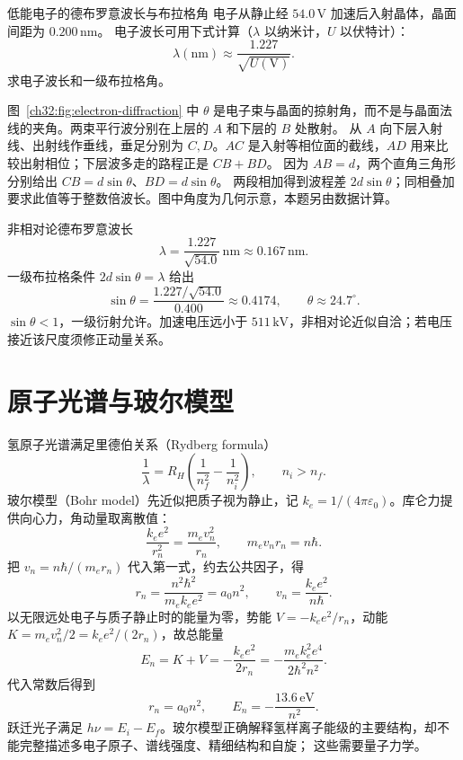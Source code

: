 \begin{origexamplebox}{低能电子的德布罗意波长与布拉格角}
电子从静止经 $54.0\,\mathrm V$ 加速后入射晶体，晶面间距为 $0.200\,\mathrm{nm}$。
电子波长可用下式计算（$\lambda$ 以纳米计，$U$ 以伏特计）：
\[
 \lambda(\mathrm{nm})\approx\frac{1.227}{\sqrt{U(\mathrm V)}}.
\]
求电子波长和一级布拉格角。
\end{origexamplebox}
\begin{xesolution}

\begin{center}

\label{ch32:fig:electron-diffraction}
\end{center}
图~\ref{ch32:fig:electron-diffraction} 中 $\theta$ 是电子束与晶面的掠射角，而不是与晶面法线的夹角。两束平行波分别在上层的 $A$ 和下层的 $B$ 处散射。
从 $A$ 向下层入射线、出射线作垂线，垂足分别为 $C,D$。$AC$ 是入射等相位面的截线，$AD$ 用来比较出射相位；下层波多走的路程正是 $CB+BD$。
因为 $AB=d$，两个直角三角形分别给出 $CB=d\sin\theta$、$BD=d\sin\theta$。
两段相加得到波程差 $2d\sin\theta$；同相叠加要求此值等于整数倍波长。图中角度为几何示意，本题另由数据计算。


非相对论德布罗意波长
\[
 \lambda=\frac{1.227}{\sqrt{54.0}}\,\mathrm{nm}
 \approx\boxed{0.167\,\mathrm{nm}}.
\]
一级布拉格条件 $2d\sin\theta=\lambda$ 给出
\[
 \sin\theta=\frac{1.227/\sqrt{54.0}}{0.400}\approx0.4174,
 \qquad \boxed{\theta\approx24.7^\circ}.
\]
$\sin\theta<1$，一级衍射允许。加速电压远小于 $511\,\mathrm{kV}$，非相对论近似自洽；若电压接近该尺度须修正动量关系。
\end{xesolution}



\section{原子光谱与玻尔模型}

氢原子光谱满足里德伯关系（Rydberg formula）
\begin{equation}
 \frac1\lambda=R_H\left(\frac1{n_f^2}-\frac1{n_i^2}\right),
 \qquad n_i>n_f.
\end{equation}
玻尔模型（Bohr model）先近似把质子视为静止，记 $k_e=1/(4\pi\varepsilon_0)$。库仑力提供向心力，角动量取离散值：
\[
 \frac{k_ee^2}{r_n^2}=\frac{m_ev_n^2}{r_n},\qquad m_ev_nr_n=n\hbar.
\]
把 $v_n=n\hbar/(m_er_n)$ 代入第一式，约去公共因子，得
\[
 r_n=\frac{n^2\hbar^2}{m_ek_ee^2}=a_0n^2,\qquad v_n=\frac{k_ee^2}{n\hbar}.
\]
以无限远处电子与质子静止时的能量为零，势能 $V=-k_ee^2/r_n$，动能 $K=m_ev_n^2/2=k_ee^2/(2r_n)$，故总能量
\[
 E_n=K+V=-\frac{k_ee^2}{2r_n}=-\frac{m_ek_e^2e^4}{2\hbar^2n^2}.
\]
代入常数后得到
\begin{equation}
 r_n=a_0n^2,\qquad E_n=-\frac{13.6\,\mathrm{eV}}{n^2}.
\end{equation}
跃迁光子满足 $h\nu=E_i-E_f$。玻尔模型正确解释氢样离子能级的主要结构，却不能完整描述多电子原子、谱线强度、精细结构和自旋；
这些需要量子力学。

